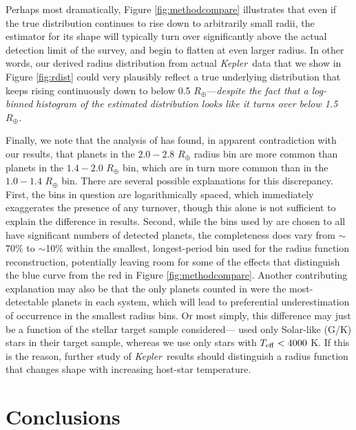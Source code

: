 \documentclass[iop]{emulateapj}
\def\Kepler{\textit{Kepler}}
\def\Rearth{R_\oplus}
\begin{document}
Perhaps most dramatically, Figure \ref{fig:methodcompare} illustrates that even if the true distribution continues to rise down to arbitrarily small radii, the estimator for its shape will typically turn over significantly above the actual detection limit of the survey, and begin to flatten at even larger radius.  In other words, our derived radius distribution from actual \Kepler\ data that we show in Figure \ref{fig:rdist} could very plausibly reflect a true underlying distribution that keeps rising continuously down to below 0.5 $\Rearth$---\textit{despite the fact that a log-binned histogram of the estimated distribution looks like it turns over below 1.5 $\Rearth$.}  

Finally, we note that the analysis of \citet{petigura2013b} has found, in apparent contradiction with our results, that planets in the $2.0-2.8$ $\Rearth$ radius bin are more common than planets in the $1.4-2.0$ $\Rearth$ bin, which are in turn more common than in the $1.0-1.4$ $\Rearth$ bin.  There are several possible explanations for this discrepancy.  First, the bins in question are logarithmically spaced, which immediately exaggerates the presence of any turnover, though this alone is not sufficient to explain the difference in results.  Second, while the bins used by \citet{petigura2013b} are chosen to all have significant numbers of detected planets, the completeness does vary from $\sim$70\% to $\sim$10\% within the smallest, longest-period bin used for the radius function reconstruction, potentially leaving room for some of the effects that distinguish the blue curve from the red in Figure \ref{fig:methodcompare}.  Another contributing explanation may also be that the only planets counted in \citet{petigura2013b} were the most-detectable planets in each system, which will lead to preferential underestimation of occurrence in the smallest radius bins.  Or most simply, this difference may just be a function of the stellar target sample considered---\citet{petigura2013b} used only Solar-like (G/K) stars in their target sample, whereas we use only stars with $T_{\rm eff} < 4000$ K.  If this is the reason, further study of \Kepler\ results should distinguish a radius function that changes shape with increasing host-star temperature.



\section{Conclusions}
\label{sec:conclusion}
 
\end{document}
